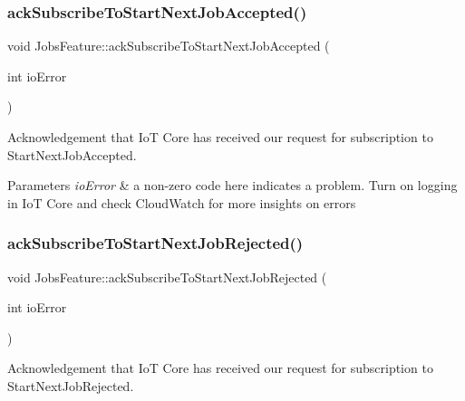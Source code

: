 \subsubsection{\texorpdfstring{ack\+Subscribe\+To\+Start\+Next\+Job\+Accepted()}{ackSubscribeToStartNextJobAccepted()}}
{\footnotesize\ttfamily void Jobs\+Feature\+::ack\+Subscribe\+To\+Start\+Next\+Job\+Accepted (\begin{DoxyParamCaption}\item[{int}]{io\+Error }\end{DoxyParamCaption})\hspace{0.3cm}{\ttfamily [private]}}



Acknowledgement that IoT Core has received our request for subscription to Start\+Next\+Job\+Accepted. 


\begin{DoxyParams}{Parameters}
{\em io\+Error} & a non-\/zero code here indicates a problem. Turn on logging in IoT Core and check Cloud\+Watch for more insights on errors \\
\hline
\end{DoxyParams}
\mbox{\label{class_aws_1_1_iot_1_1_device_client_1_1_jobs_1_1_jobs_feature_ae34fa1e7a48d09d81b7007c991a1719f}} 
\subsubsection{\texorpdfstring{ack\+Subscribe\+To\+Start\+Next\+Job\+Rejected()}{ackSubscribeToStartNextJobRejected()}}
{\footnotesize\ttfamily void Jobs\+Feature\+::ack\+Subscribe\+To\+Start\+Next\+Job\+Rejected (\begin{DoxyParamCaption}\item[{int}]{io\+Error }\end{DoxyParamCaption})\hspace{0.3cm}{\ttfamily [private]}}



Acknowledgement that IoT Core has received our request for subscription to Start\+Next\+Job\+Rejected. 


